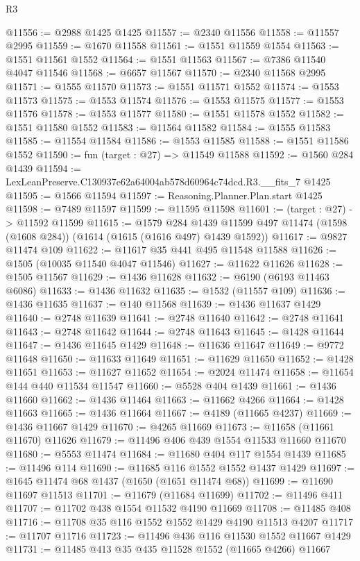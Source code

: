 \begin{lexlean}{R3}
\begin{coremodule}
@11556 := @2988 @1425 @1425
@11557 := @2340 @11556
@11558 := @11557 @2995
@11559 := @1670 @11558
@11561 := @1551 @11559 @1554
@11563 := @1551 @11561 @1552
@11564 := @1551 @11563
@11567 := @7386 @11540 @4047 @11546
@11568 := @6657 @11567
@11570 := @2340 @11568 @2995
@11571 := @1555 @11570
@11573 := @1551 @11571 @1552
@11574 := @1553 @11573
@11575 := @1553 @11574
@11576 := @1553 @11575
@11577 := @1553 @11576
@11578 := @1553 @11577
@11580 := @1551 @11578 @1552
@11582 := @1551 @11580 @1552
@11583 := @11564 @11582
@11584 := @1555 @11583
@11585 := @11554 @11584
@11586 := @1553 @11585
@11588 := @1551 @11586 @1552
@11590 := fun (target : @27) => @11549 @11588
@11592 := @1560 @284 @1439
@11594 := LexLeanPreserve.C130937e62a64004ab578d60964c74dcd.R3.__fits_7 @1425
@11595 := @1566 @11594
@11597 := Reasoning.Planner.Plan.start @1425
@11598 := @7489 @11597
@11599 := @11595 @11598
@11601 := (target : @27) -> @11592 @11599
@11615 := @1579
    @284
    @1439
    @11599
    @497
    @11474
    (@1598 (@1608 @284))
    (@1614 (@1615 (@1616 @497) @1439 @1592))
@11617 := @9827 @11474 @109
@11622 := @11617 @35 @441 @495 @11548 @11588
@11626 := @1505 (@10035 @11540 @4047 @11546)
@11627 := @11622 @11626
@11628 := @1505 @11567
@11629 := @1436 @11628
@11632 := @6190 (@6193 @11463 @6086)
@11633 := @1436 @11632
@11635 := @1532 (@11557 @109)
@11636 := @1436 @11635
@11637 := @140 @11568
@11639 := @1436 @11637 @1429
@11640 := @2748 @11639
@11641 := @2748 @11640
@11642 := @2748 @11641
@11643 := @2748 @11642
@11644 := @2748 @11643
@11645 := @1428 @11644
@11647 := @1436 @11645 @1429
@11648 := @11636 @11647
@11649 := @9772 @11648
@11650 := @11633 @11649
@11651 := @11629 @11650
@11652 := @1428 @11651
@11653 := @11627 @11652
@11654 := @2024 @11474
@11658 := @11654 @144 @440 @11534 @11547
@11660 := @5528 @404 @1439
@11661 := @1436 @11660
@11662 := @1436 @11464
@11663 := @11662 @4266
@11664 := @1428 @11663
@11665 := @1436 @11664
@11667 := @4189 (@11665 @4237)
@11669 := @1436 @11667 @1429
@11670 := @4265 @11669
@11673 := @11658 (@11661 @11670) @11626
@11679 := @11496 @406 @439 @1554 @11533 @11660 @11670
@11680 := @5553 @11474
@11684 := @11680 @404 @117 @1554 @1439
@11685 := @11496 @114
@11690 := @11685 @116 @1552 @1552 @1437 @1429
@11697 := @1645 @11474 @68 @1437 (@1650 (@1651 @11474 @68))
@11699 := @11690 @11697 @11513
@11701 := @11679 (@11684 @11699)
@11702 := @11496 @411
@11707 := @11702 @438 @1554 @11532 @4190 @11669
@11708 := @11485 @408
@11716 := @11708 @35 @116 @1552 @1552 @1429 @4190 @11513 @4207
@11717 := @11707 @11716
@11723 := @11496 @436 @116 @11530 @1552 @11667 @1429
@11731 := @11485 @413 @35 @435 @11528 @1552 (@11665 @4266) @11667

\end{coremodule}
\end{lexlean}
